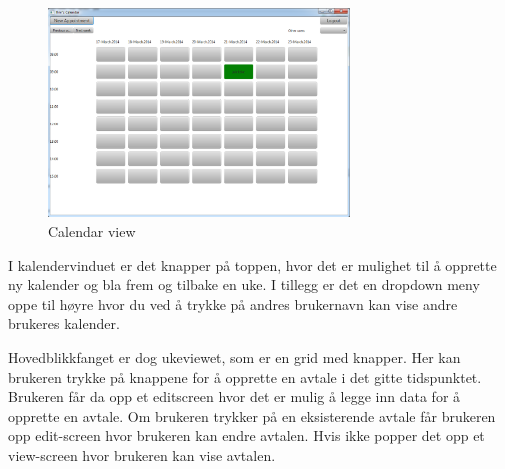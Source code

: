 \documentclass{article}
\begin{document}
\begin{figure}[h!] 
    \begin{center} 
        \includegraphics[width=8cm]{MainView.png}
        \caption{Calendar view}
    \label{mainview}
    \end{center}
\end{figure}
I kalendervinduet er det knapper på toppen, hvor det er mulighet til å opprette ny kalender og bla frem og tilbake en uke. I tillegg er det en dropdown meny oppe til høyre hvor du ved å trykke på andres brukernavn kan vise andre brukeres kalender.

Hovedblikkfanget er dog ukeviewet, som er en grid med knapper. Her kan brukeren trykke på knappene for å opprette en avtale i det gitte tidspunktet. Brukeren får da opp et editscreen hvor det er mulig å legge inn data for å opprette en avtale. Om brukeren trykker på en eksisterende avtale får brukeren opp edit-screen hvor brukeren kan endre avtalen. Hvis ikke popper det opp et view-screen hvor brukeren kan vise avtalen.

\newpage
\end{document}
